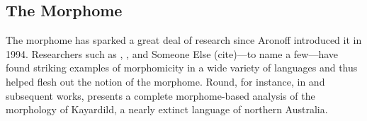 %

\subsection{The Morphome}
\label{sec:the-morphome}
The morphome has sparked a 
great deal of research since Aronoff introduced it in 1994. Researchers
such as \cite{maiden:2005, maiden:md:2016}, \cite{round:2009, round:2011, 
round:2012, round:2015, round:md:2016}, and Someone Else (cite)---to name 
a few---have found striking examples of morphomicity in a wide variety of 
languages and thus helped flesh out the notion of the morphome.
Round, for instance, in \cite{round:2009} and subsequent works, 
presents a complete morphome-based analysis of the morphology of 
Kayardild, a nearly extinct language of northern Australia. 
 

